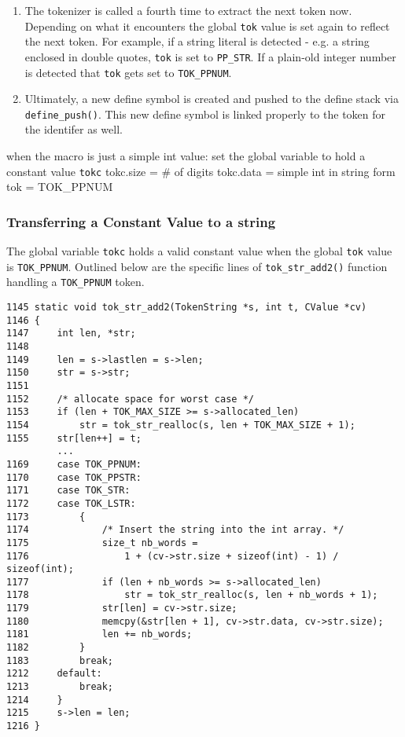 \begin{enumerate}
\item The tokenizer is called a fourth time to extract the next token now. Depending on what it encounters the global \verb|tok| value is set again to reflect the next token. For example, if a string literal is detected - e.g. a string enclosed in double quotes, \verb|tok| is set to \verb|PP_STR|. If a plain-old integer number is detected that \verb|tok| gets set to \verb|TOK_PPNUM|.

\item Ultimately, a new define symbol is created and pushed to the define stack via \verb|define_push()|. This new define symbol is linked properly to the token for the identifer as well.


\end{enumerate}







when the macro is just a simple int value:
        set the global variable to hold a constant value \verb|tokc|
        tokc.size = \# of digits
        tokc.data = simple int in string form
        tok = TOK\_PPNUM


\subsubsection{Transferring a Constant Value to a string}

The global variable \verb|tokc| holds a valid constant value when the global \verb|tok| value is \verb|TOK_PPNUM|. Outlined below are the specific lines of \verb|tok_str_add2()| function handling a \verb|TOK_PPNUM| token.

\begin{verbatim}
1145 static void tok_str_add2(TokenString *s, int t, CValue *cv)
1146 {
1147     int len, *str;
1148 
1149     len = s->lastlen = s->len;
1150     str = s->str;
1151 
1152     /* allocate space for worst case */
1153     if (len + TOK_MAX_SIZE >= s->allocated_len)
1154         str = tok_str_realloc(s, len + TOK_MAX_SIZE + 1);
1155     str[len++] = t;
         ...
1169     case TOK_PPNUM:
1170     case TOK_PPSTR:
1171     case TOK_STR:
1172     case TOK_LSTR:
1173         {
1174             /* Insert the string into the int array. */
1175             size_t nb_words =
1176                 1 + (cv->str.size + sizeof(int) - 1) / sizeof(int);
1177             if (len + nb_words >= s->allocated_len)
1178                 str = tok_str_realloc(s, len + nb_words + 1);
1179             str[len] = cv->str.size;
1180             memcpy(&str[len + 1], cv->str.data, cv->str.size);
1181             len += nb_words;
1182         }
1183         break;
1212     default:
1213         break;
1214     }
1215     s->len = len;
1216 }
\end{verbatim}

